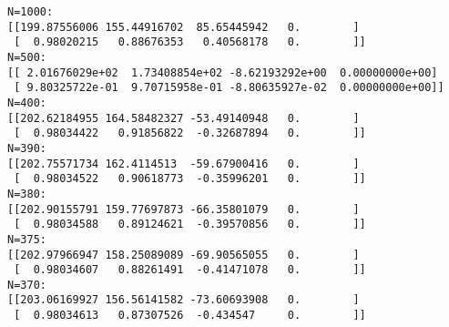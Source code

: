 \documentclass[11pt]{article}
\begin{document}
    \begin{Verbatim}[commandchars=\\\{\}]
N=1000:
[[199.87556006 155.44916702  85.65445942   0.        ]
 [  0.98020215   0.88676353   0.40568178   0.        ]]
N=500:
[[ 2.01676029e+02  1.73408854e+02 -8.62193292e+00  0.00000000e+00]
 [ 9.80325722e-01  9.70715958e-01 -8.80635927e-02  0.00000000e+00]]
N=400:
[[202.62184955 164.58482327 -53.49140948   0.        ]
 [  0.98034422   0.91856822  -0.32687894   0.        ]]
N=390:
[[202.75571734 162.4114513  -59.67900416   0.        ]
 [  0.98034522   0.90618773  -0.35996201   0.        ]]
N=380:
[[202.90155791 159.77697873 -66.35801079   0.        ]
 [  0.98034588   0.89124621  -0.39570856   0.        ]]
N=375:
[[202.97966947 158.25089089 -69.90565055   0.        ]
 [  0.98034607   0.88261491  -0.41471078   0.        ]]
N=370:
[[203.06169927 156.56141582 -73.60693908   0.        ]
 [  0.98034613   0.87307526  -0.434547     0.        ]]
    \end{Verbatim}
\end{document}
